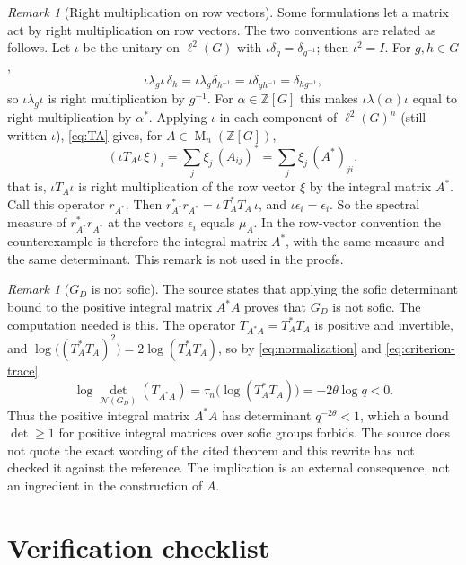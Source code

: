 \documentclass[11pt]{article}
\theoremstyle{remark}
\newtheorem{remark}[theorem]{Remark}
\numberwithin{equation}{section}
\newcommand{\Z}{\mathbb Z}
\newcommand{\Mat}{\operatorname{M}}
\newcommand{\N}{\mathcal N}
\begin{document}
\begin{remark}[Right multiplication on row vectors]\label{rem:convention}
Some formulations let a matrix act by right multiplication on row vectors. The two conventions are related as follows. Let $\iota$ be the unitary on $\ell^2(G)$ with $\iota\delta_g=\delta_{g^{-1}}$; then $\iota^2=I$. For $g,h\in G$,
\[
 \iota\lambda_g\iota\,\delta_h=\iota\lambda_g\delta_{h^{-1}}=\iota\delta_{gh^{-1}}=\delta_{hg^{-1}},
\]
so $\iota\lambda_g\iota$ is right multiplication by $g^{-1}$. For $\alpha\in\Z[G]$ this makes $\iota\lambda(\alpha)\iota$ equal to right multiplication by $\alpha^*$. Applying $\iota$ in each component of $\ell^2(G)^n$ (still written $\iota$), \eqref{eq:TA} gives, for $A\in\Mat_n(\Z[G])$,
\[
 (\iota T_A\iota\,\xi)_i=\sum_j\xi_j\,(A_{ij})^*=\sum_j\xi_j\,(A^*)_{ji},
\]
that is, $\iota T_A\iota$ is right multiplication of the row vector $\xi$ by the integral matrix $A^*$. Call this operator $r_{A^*}$. Then $r_{A^*}^*r_{A^*}=\iota\,T_A^*T_A\,\iota$, and $\iota\epsilon_i=\epsilon_i$. So the spectral measure of $r_{A^*}^*r_{A^*}$ at the vectors $\epsilon_i$ equals $\mu_A$. In the row-vector convention the counterexample is therefore the integral matrix $A^*$, with the same measure and the same determinant. This remark is not used in the proofs.
\end{remark}

\begin{remark}[$G_D$ is not sofic]\label{rem:sofic}
The source states that applying the sofic determinant bound \cite[Theorem 5]{ElekSzabo2005} to the positive integral matrix $A^*A$ proves that $G_D$ is not sofic. The computation needed is this. The operator $T_{A^*A}=T_A^*T_A$ is positive and invertible, and $\log\bigl((T_A^*T_A)^2\bigr)=2\log(T_A^*T_A)$, so by \eqref{eq:normalization} and \eqref{eq:criterion-trace}
\[
 \log\det_{\N(G_D)}(T_{A^*A})=\tau_n\bigl(\log(T_A^*T_A)\bigr)=-2\theta\log q<0 .
\]
Thus the positive integral matrix $A^*A$ has determinant $q^{-2\theta}<1$, which a bound $\det\ge1$ for positive integral matrices over sofic groups forbids. The source does not quote the exact wording of the cited theorem and this rewrite has not checked it against the reference. The implication is an external consequence, not an ingredient in the construction of $A$.
\end{remark}

\section*{Verification checklist}
\end{document}
